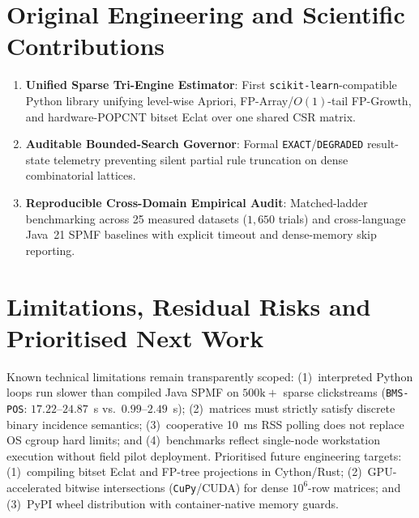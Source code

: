 \section{Original Engineering and Scientific Contributions}
\begin{enumerate}
  \item \textbf{Unified Sparse Tri-Engine Estimator}: First \texttt{scikit-learn}-compatible Python library unifying level-wise Apriori, FP-Array/$O(1)$-tail FP-Growth, and hardware-POPCNT bitset Eclat over one shared CSR matrix.
  \item \textbf{Auditable Bounded-Search Governor}: Formal \texttt{EXACT}/\texttt{DEGRADED} result-state telemetry preventing silent partial rule truncation on dense combinatorial lattices.
  \item \textbf{Reproducible Cross-Domain Empirical Audit}: Matched-ladder benchmarking across 25 measured datasets ($1{,}650$ trials) and cross-language Java~21 SPMF baselines with explicit timeout and dense-memory skip reporting.
\end{enumerate}

\section{Limitations, Residual Risks and Prioritised Next Work}
Known technical limitations remain transparently scoped: (1)~interpreted Python loops run slower than compiled Java SPMF on $500\text{k}+$ sparse clickstreams (\texttt{BMS-POS}: $17.22\text{--}24.87$~s vs.\ $0.99\text{--}2.49$~s); (2)~matrices must strictly satisfy discrete binary incidence semantics; (3)~cooperative 10~ms RSS polling does not replace OS cgroup hard limits; and (4)~benchmarks reflect single-node workstation execution without field pilot deployment. Prioritised future engineering targets: (1)~compiling bitset Eclat and FP-tree projections in Cython/Rust; (2)~GPU-accelerated bitwise intersections (\texttt{CuPy}/CUDA) for dense $10^6$-row matrices; and (3)~PyPI wheel distribution with container-native memory guards.\par
\endgroup

